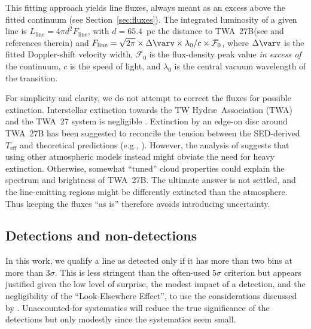\documentclass[twocolumn,twocolumnappendix]{aastex631}
\newcommand{\Fldichte}{\ensuremath{\mathcal{F}}\xspace} %
\def\FLinienspitze{\ensuremath{\Fldichte_{0}}\xspace}           %
\def\FLinie{\ensuremath{F_{\textrm{line}}}\xspace}                %
\def\LLinie{\ensuremath{L_{\textrm{line}}}\xspace}                      %
\newcommand{\Teff}{\ensuremath{T_{\textrm{eff}}}\xspace}         %
\def\Dv{\ensuremath{\Delta \varv}\xspace}
\def\twb{TWA~27B\xspace}
\begin{document}
%
%
%



%
This fitting approach yields line fluxes, always meant as an excess above the fitted continuum (see Section~\ref{sec:fluxes}). The integrated luminosity of a given line is $\LLinie=4\pi d^2 \FLinie$, with $d=65.4$~pc the distance to \twb (see \citealp{luhman23c} and references therein) and $\FLinie=\sqrt{2\pi}\times\Dv\times\lambda_0/c\times \FLinienspitze$,
where $\Delta \varv$ is the fitted Doppler-shift velocity width,
\FLinienspitze is the flux-density peak value \textit{in excess of} the continuum,
$c$ is the speed of light, and $\lambda_0$ is the central vacuum wavelength of the transition. 

For simplicity and clarity, we do not attempt to correct the fluxes for possible extinction.
Interstellar extinction towards the TW Hydr\ae\ Association (TWA) and the TWA~27 system is negligible \citep{herczeg04,mohanty07}. Extinction by an edge-on disc around \twb has been suggested to reconcile the tension between the SED-derived \Teff and theoretical predictions (e.g., \citealp{mohanty07}). However, the analysis of \citet{luhman23c} suggests that using other atmospheric models instead might obviate the need for heavy extinction. Otherwise, somewhat ``tuned'' cloud properties could explain the spectrum and brightness of \twb \citep{skemer11}. The ultimate answer is not settled, and the line-emitting regions might be differently extincted than the atmosphere.
Thus keeping the fluxes ``as is'' therefore avoids introducing uncertainty.



\subsection{Detections and non-detections}
 \label{sec:detectnondetect}

%
%
%
%

%

In this work, we qualify a line as detected only if it has more than two bins at more than $3\sigma$. This is less stringent than the often-used $5\sigma$ criterion but appears justified given the low level of surprise, the modest impact of a detection, and the negligibility of the ``Look-Elsewhere Effect'', to use the considerations discussed by \citet{lyons13}. Unaccounted-for systematics will reduce the true significance of the detections but only modestly since the systematics seem small.
\end{document}
